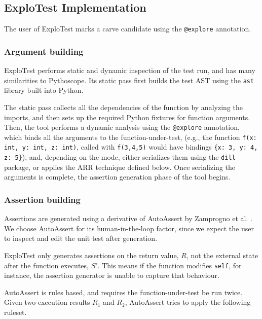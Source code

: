 \subsection{ExploTest Implementation}
The user of ExploTest marks a carve candidate using the \verb|@explore| annotation.

\subsubsection{Argument building}
ExploTest performs static and dynamic inspection of the test run, and has many similarities to Pythoscope. Its static pass first builds the
test AST using the \verb|ast| library built into Python.

The static pass collects all the dependencies of the function by analyzing the imports, and then
sets up the required Python fixtures for function arguments. Then, the tool performs a dynamic analysis using the \verb|@explore| annotation,
which binds all the arguments to the function-under-test, (e.g., the function \verb|f(x: int, y: int, z: int)|, called with \verb|f(3,4,5)|
would have bindings \verb|{x: 3, y: 4, z: 5}|), and, depending on the mode, either serializes them using the \verb|dill| package, or applies the ARR technique defined below.
Once serializing the arguments is complete,
the assertion generation phase of the tool begins.


\subsubsection{Assertion building}
Assertions are generated using a derivative of AutoAssert by Zamprogno et al. \cite{zamprogno2022dynamic}. We choose AutoAssert for its
human-in-the-loop factor, since we expect the user to inspect and edit the unit test after generation.

ExploTest only generates assertions on the
return value, $R$, not the external state after the function executes, $S'$. This means if the function modifies \verb|self|, for instance,
the assertion generator is unable to capture that behaviour.

AutoAssert is rules based, and requires the function-under-test be run twice. Given
two execution results $R_1$ and $R_2$, AutoAssert tries to apply the following ruleset.


